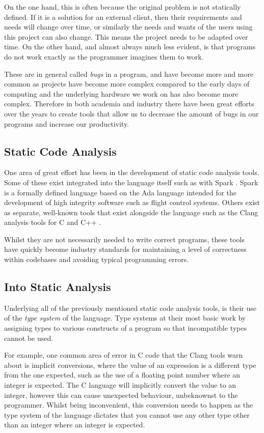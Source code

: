 \documentclass{l4proj}
\begin{document}
On the one hand, this is often because the original problem is not statically defined.
If it is a solution for an external client, then their requirements and needs will change over time, or similarly the needs and wants of the users using this project can also change.
This means the project needs to be adapted over time.
On the other hand, and almost always much less evident, is that programs do not work exactly as the programmer imagines them to work.

These are in general called \emph{bugs} in a program, and have become more and more common as projects have become more complex compared to the early days of computing and the underlying hardware we work on has also become more complex.
Therefore in both academia and industry there have been great efforts over the years to create tools that allow us to decrease the amount of bugs in our programs and increase our productivity.

\subsection{Static Code Analysis}

One area of great effort has been in the development of static code analysis tools.
Some of these exist integrated into the language itself such as with Spark \citep{Carre1990}.
Spark is a formally defined language based on the Ada \citep{Ada1979} language intended for the development of high integrity software such as flight control systems.
Others exist as separate, well-known tools that exist alongside the language such as the Clang analysis tools for C and C++ \citep{kremenek2008}.

Whilst they are not necessarily needed to write correct programs, these tools have quickly become industry standards for maintaining a level of correctness within codebases and avoiding typical programming errors.

\subsection{Into Static Analysis}

Underlying all of the previously mentioned static code analysis tools, is their use of the \emph{type system} of the language.
Type systems at their most basic work by assigning types to various constructs of a program so that incompatible types cannot be used.

For example, one common area of error in C code that the Clang tools warn about is implicit conversions, where the value of an expression is a different type from the one expected, such as the use of a floating point number where an integer is expected.
The C language will implicitly convert the value to an integer, however this can cause unexpected behaviour, unbeknownst to the programmer.
Whilst being inconvenient, this conversion needs to happen as the type system of the language dictates that you cannot use any other type other than an integer where an integer is expected.
\end{document}
